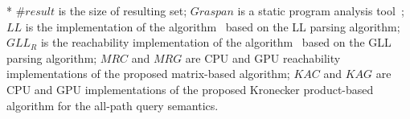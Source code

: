 \begin{table} [htbp]
\begin{threeparttable}
{\begin{tablenotes}
            \item[*] $\#\textit{result}$ is the size of resulting set; $\textit{Graspan}$ is a static program analysis tool~\cite{graspan}; $\textit{LL}$ is the implementation of the algorithm~\cite{medeiros2018efficient} based on the LL parsing algorithm; $\textit{GLL}_{\textit{R}}$ is the reachability implementation of the algorithm~\cite{grigorev2017context} based on the GLL parsing algorithm; $\textit{MRC}$ and $\textit{MRG}$ are CPU and GPU reachability implementations of the proposed matrix-based algorithm; $\textit{KAC}$ and $\textit{KAG}$ are CPU and GPU implementations of the proposed Kronecker product-based algorithm for the all-path query semantics.
        \end{tablenotes}    }
    \end{threeparttable}
\end{table}


